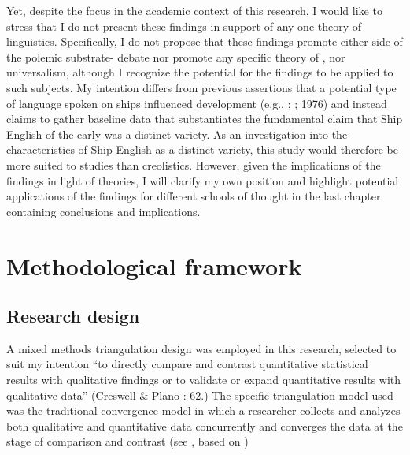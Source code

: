 Yet, despite the  focus in the academic context of this research, I would like to stress that I do not present these findings in support of any one theory of  linguistics. Specifically, I do not propose that these findings promote either side of the polemic substrate- debate nor promote any specific theory of ,  nor universalism, although I recognize the potential for the findings to be applied to such subjects. My intention differs from previous assertions that a potential type of language spoken on ships influenced  development (e.g., \citealt{Reinecke1938}; \citealt{Hancock1972}; 1976) and instead claims to gather baseline data that substantiates the fundamental claim that Ship English of the early  was a distinct variety. As an investigation into the characteristics of Ship English as a distinct variety, this study would therefore be more suited to  studies than creolistics. However, given the implications of the findings in light of  theories, I will clarify my own position and highlight potential applications of the findings for different schools of thought in the last chapter containing conclusions and implications. 



\section{{Methodological framework}}\label{sec:1.3}



\subsection{{Research design}}\label{sec:1.3.1}



A mixed methods triangulation design was employed in this research, selected to suit my intention “to directly compare and contrast quantitative statistical results with qualitative findings or to validate or expand quantitative results with qualitative data” (Creswell \& Plano \citealt{Clark2007}: 62.) The specific triangulation model used was the traditional convergence model in which a researcher collects and analyzes both qualitative and quantitative data concurrently and converges the data at the stage of comparison and contrast (see , based on \citealt{CreswellPlanoClark2007})


